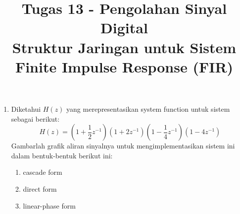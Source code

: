 \documentclass[12pt,a4paper]{article}
\title{Tugas 13 - Pengolahan Sinyal Digital\\
	Struktur Jaringan untuk Sistem Finite Impulse Response (FIR)}
\date{}
\begin{document}
	\maketitle
	\date{}
	\begin{enumerate}
		\item Diketahui $ H(z) $ yang merepresentasikan system function untuk sistem sebagai berikut:
		\[ H(z) = \left( 1 + \frac{1}{2}z^{-1} \right) \left( 1 + 2z^{-1} \right) \left( 1 - \frac{1}{4}z^{-1} \right) \left( 1 - 4z^{-1} \right)\]
		Gambarlah grafik aliran sinyalnya untuk mengimplementasikan sistem ini dalam bentuk-bentuk berikut ini:
		\begin{enumerate}
			\item cascade form
			\item direct form
			\item linear-phase form
		\end{enumerate}
	\end{enumerate}
\end{document}
